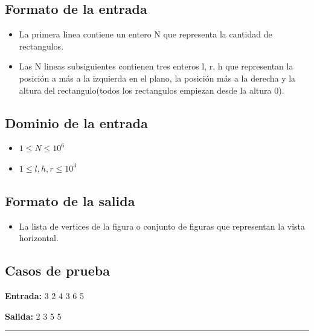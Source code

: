 \documentclass{article}
\begin{document}
\begin{flushleft}
\subsection*{Formato de la entrada}
\begin{itemize}
    \item La primera linea contiene un entero N que representa la cantidad de
        rectangulos.
    \item Las N lineas subsiguientes contienen tres enteros l, r, h que representan
        la posición a más a la izquierda en el plano, la posición más a la derecha
        y la altura del rectangulo(todos los rectangulos empiezan desde la altura 0).
\end{itemize}
\subsection*{Dominio de la entrada}
    \begin{itemize}
        \item $ 1 \leq N \leq 10^6 $
        \item $ 1 \leq l, h, r \leq 10 ^ 3$
    \end{itemize}
\subsection*{Formato de la salida}
    \begin{itemize}
        \item La lista de vertices de la figura o conjunto de figuras que representan
            la vista horizontal.
    \end{itemize}
\subsection*{Casos de prueba}
    \begin{itemize}
        \begin{minipage}{.4\textwidth}
        \item \textbf{Entrada:}   3 2  4 3  6 5
        \end{minipage}
        \begin{minipage}{.4\textwidth}
        \item \textbf{Salida:}  2  3  5  5
        \end{minipage}
    \end{itemize}
\vspace{0.5cm}
\hrule
\vspace{0.5cm}

\end{flushleft}
\end{document}

